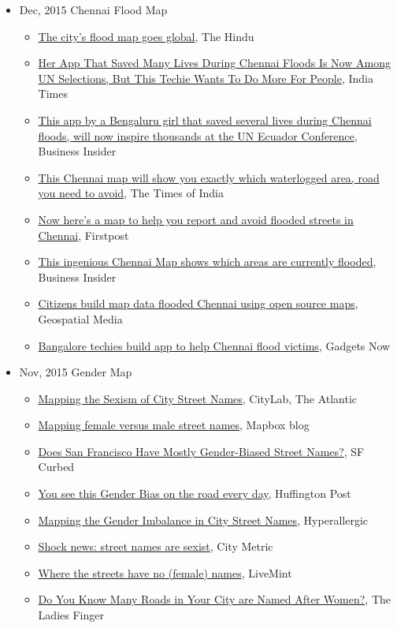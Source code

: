 \documentclass{scrartcl}
\newenvironment{myitemize}
{ \begin{itemize}
    \footnotesize\setlength{\itemsep}{0pt}
    \footnotesize\setlength{\parskip}{0pt}
    \footnotesize\setlength{\parsep}{0pt}     }
{ \end{itemize}                  }  %
\begin{document}
\begin{cv}{}
\centering{}
\begin{myitemize}
  \item {Dec, 2015} {Chennai Flood Map}
    \begin{myitemize}
      \item \href{https://tinyurl.com/y8zmhjb8}{The city’s flood map goes global}, The Hindu 
      \item \href{https://tinyurl.com/yagtulwt}{Her App That Saved Many Lives During Chennai Floods Is Now Among UN Selections, But This Techie Wants To Do More For People}, India Times
      \item \href{https://tinyurl.com/y94mduyo}{This app by a Bengaluru girl that saved several lives during Chennai floods, will now inspire thousands at the UN Ecuador Conference}, Business Insider
      \item \href{https://tinyurl.com/y9hv33go}{This Chennai map will show you exactly which waterlogged area, road you need to avoid}, The Times of India
      \item \href{https://tinyurl.com/zj77c24}{Now here's a map to help you report and avoid flooded streets in Chennai}, Firstpost
      \item \href{https://tinyurl.com/y9b8uof6}{This ingenious Chennai Map shows which areas are currently flooded}, Business Insider
      \item \href{https://tinyurl.com/y9l2hve9}{Citizens build map data flooded Chennai using open source maps}, Geospatial Media
      \item \href{https://tinyurl.com/y8jznfc8}{Bangalore techies build app to help Chennai flood victims}, Gadgets Now
    \end{myitemize}
  \item {Nov, 2015} {Gender Map}
    \begin{myitemize}
      \item \href{https://tinyurl.com/ybrjjmbq}{Mapping the Sexism of City Street Names}, CityLab, The Atlantic
      \item \href{https://tinyurl.com/y6urpyzs}{Mapping female versus male street names}, Mapbox blog
      \item \href{https://tinyurl.com/y9mrf4yp}{Does San Francisco Have Mostly Gender-Biased Street Names?}, SF Curbed
      \item \href{https://tinyurl.com/ybsqcmv5}{You see this Gender Bias on the road every day}, Huffington Post
      \item \href{https://tinyurl.com/yabajxj2}{Mapping the Gender Imbalance in City Street Names}, Hyperallergic
      \item \href{https://tinyurl.com/ycpn4hmw}{Shock news: street names are sexist}, City Metric
      \item \href{https://tinyurl.com/jypreu7}{Where the streets have no (female) names}, LiveMint
      \item \href{https://tinyurl.com/ya93krx2}{Do You Know Many Roads in Your City are Named After Women?}, The Ladies Finger
   \end{myitemize}
\end{myitemize}


\end{cv}
\end{document}

